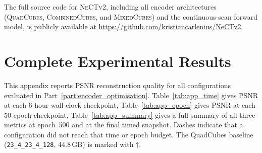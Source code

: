 \documentclass[12pt, a4paper, twoside]{report}
\newcommand{\NeCTv}{\textsc{NeCTv2}}
\newcommand{\MixedCubes}{\textsc{MixedCubes}}
\newcommand{\QuadCubes}{\textsc{QuadCubes}}
\newcommand{\CombinedCubes}{\textsc{CombinedCubes}}
\begin{document}
The full source code for \NeCTv{}, including all encoder architectures (\QuadCubes, \CombinedCubes, and \MixedCubes{}) and the continuous-scan forward model, is publicly available at \url{https://github.com/kristiancarlenius/NeCTv2}.

\cleardoublepage



\appendix

\chapter{Complete Experimental Results}
\label{app:experimental}

This appendix reports PSNR reconstruction quality for all configurations evaluated in Part~\ref{part:encoder_optimisation}. Table~\ref{tab:app_time} gives PSNR at each 6-hour wall-clock checkpoint, Table~\ref{tab:app_epoch} gives PSNR at each 50-epoch checkpoint, Table~\ref{tab:app_summary} gives a full summary of all three metrics at epoch~500 and at the final timed snapshot. Dashes indicate that a configuration did not reach that time or epoch budget. The QuadCubes baseline (\texttt{23\_4\_23\_4\_128}, 44.8\,GB) is marked with $\dagger$.

\end{document}
